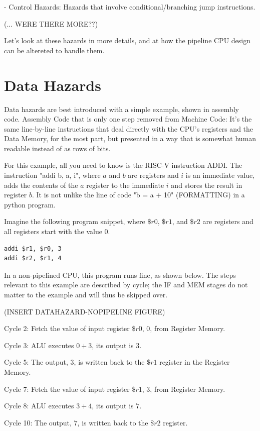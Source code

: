 \documentclass[12pt,twoside]{reedthesis}
\begin{document}
- Control Hazards: Hazards that involve conditional/branching jump instructions.

(... WERE THERE MORE??)

Let's look at these hazards in more details, and at how the pipeline CPU design can be altereted to handle them.

\section{Data Hazards}

Data hazards are best introduced with a simple example, shown in assembly code. Assembly Code that is only one step removed from Machine Code: It's the same line-by-line instructions that deal directly with the CPU's registers and the Data Memory, for the most part, but presented in a way that is somewhat human readable instead of as rows of bits.

For this example, all you need to know is the RISC-V instruction ADDI. The instruction "addi b, a, i", where $a$ and $b$ are registers and $i$ is an immediate value, adds the contents of the $a$ register to the immediate $i$ and stores the result in register $b$. It is not unlike the line of code "b = a + 10" (FORMATTING) in a python program.

Imagine the following program snippet, where $\$r0$, $\$r1$, and $\$r2$ are registers and all registers start with the value 0.

\break
\begin{verbatim}
addi $r1, $r0, 3
addi $r2, $r1, 4
\end{verbatim}

In a non-pipelined CPU, this program runs fine, as shown below. The steps relevant to this example are described by cycle; the IF and MEM stages do not matter to the example and will thus be skipped over.

(INSERT DATAHAZARD-NOPIPELINE FIGURE)

Cycle 2: Fetch the value of input register $\$r0$, $0$, from Register Memory.

Cycle 3: ALU executes $0 + 3$, its output is $3$.

Cycle 5: The output, $3$, is written back to the $\$r1$ register in the Register Memory.

Cycle 7: Fetch the value of input register $\$r1$, $3$, from Register Memory.

Cycle 8: ALU executes $3 + 4$, its output is $7$.

Cycle 10: The output, $7$, is written back to the $\$r2$ register.
\end{document}
